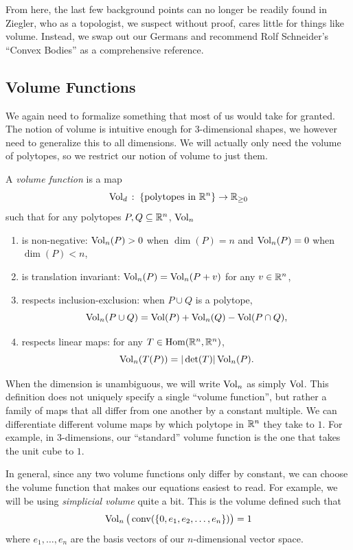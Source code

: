 \documentclass[12pt,oneside]{../../sfsuthesis}
\begin{document}
From here, the last few background points can no longer be readily found in Ziegler, who as a topologist, we suspect without proof, cares little for things like volume.
Instead, we swap out our Germans and recommend Rolf Schneider's ``Convex Bodies'' \cite{schneiderConvexBodiesBrunn2013} as a comprehensive reference.

\subsection{Volume Functions}
We again need to formalize something that most of us would take for granted.
The notion of volume is intuitive enough for 3-dimensional shapes, we however need to generalize this to all dimensions.
We will actually only need the volume of polytopes, so we restrict our notion of volume to just them.
\begin{definition}
    A \emph{volume function} is a map
    \[
        \operatorname{Vol}_d\,:\; \{\text{polytopes in \( \mathbb{R}^n \)}\} \to \mathbb{R}_{\geq 0}
    \]
    such that for any polytopes \( P,Q \subseteq \mathbb{R}^n \), \( \operatorname{Vol}_n \)
    \begin{enumerate}
        \item{is non-negative:} \( \operatorname{Vol}_n(P) > 0 \) when \( \dim(P) = n \) and \( \operatorname{Vol}_n(P) = 0 \) when \( \dim(P) < n \),
        \item{is translation invariant:} \( \operatorname{Vol}_n(P) =  \operatorname{Vol}_n(P+v) \) for any \( v \in \mathbb{R}^n \),
        \item{respects inclusion-exclusion:} when \( P \cup Q \) is a polytope,
        \[
            \operatorname{Vol}_n(P \cup Q) = \operatorname{Vol}(P) + \operatorname{Vol}_n(Q) - \operatorname{Vol}(P \cap Q),
        \]
        \item{respects linear maps:} for any \( T \in \operatorname{Hom}(\mathbb{R}^n, \mathbb{R}^n) \),
        \[
            \operatorname{Vol}_n(T(P)) = |\det(T)|\operatorname{Vol}_n(P).
        \]
    \end{enumerate}
\end{definition}
When the dimension is unambiguous, we will write \( \operatorname{Vol}_n \) as simply \( \operatorname{Vol} \).
This definition does not uniquely specify a single ``volume function'', but rather a family of maps that all differ from one another by a constant multiple.
We can differentiate different volume maps by which polytope in \( \mathbb{R}^n \) they take to \( 1 \).
For example, in \( 3 \)-dimensions, our ``standard'' volume function is the one that takes the unit cube to \( 1 \).

In general, since any two volume functions only differ by constant, we can choose the volume function that makes our equations easiest to read.
For example, we will be using \textit{simplicial volume} quite a bit.
This is the volume defined such that
\[
    \operatorname{Vol}_n \big(\operatorname{conv}(\{0, e_1, e_2, \dots, e_n\})\big) = 1
\]
where \( e_1, \dots, e_n \) are the basis vectors of our \( n \)-dimensional vector space.
\end{document}
